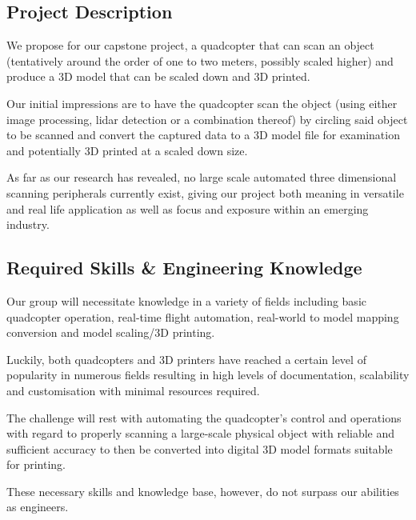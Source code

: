\documentclass[10pt,letterpaper]{article}
\begin{document}
\subsection{Project Description}
We propose for our capstone project, a quadcopter that can scan an object (tentatively around the order of one to two meters, possibly scaled higher) and produce a 3D model that can be scaled down and 3D printed. \par 
Our initial impressions are to have the quadcopter scan the object (using either image processing, lidar detection or a combination thereof) by circling said object to be scanned and convert the captured data to a 3D model file for examination and potentially 3D printed at a scaled down size. \par 
As far as our research has revealed, no large scale automated three dimensional scanning peripherals currently exist, giving our project both meaning in versatile and real life application as well as focus and exposure within an emerging industry.

\subsection{Required Skills \& Engineering Knowledge}
Our group will necessitate knowledge in a variety of fields including basic quadcopter operation, real-time flight automation, real-world to model mapping conversion and model scaling/3D printing. \par 
Luckily, both quadcopters and 3D printers have reached a certain level of popularity in numerous fields resulting in high levels of documentation, scalability and customisation with minimal resources required. \par 
The challenge will rest with automating the quadcopter's control and operations with regard to properly scanning a large-scale physical object with reliable and sufficient accuracy to then be converted into digital 3D model formats suitable for printing. \par 
These necessary skills and knowledge base, however, do not surpass our abilities as engineers.
\end{document}
